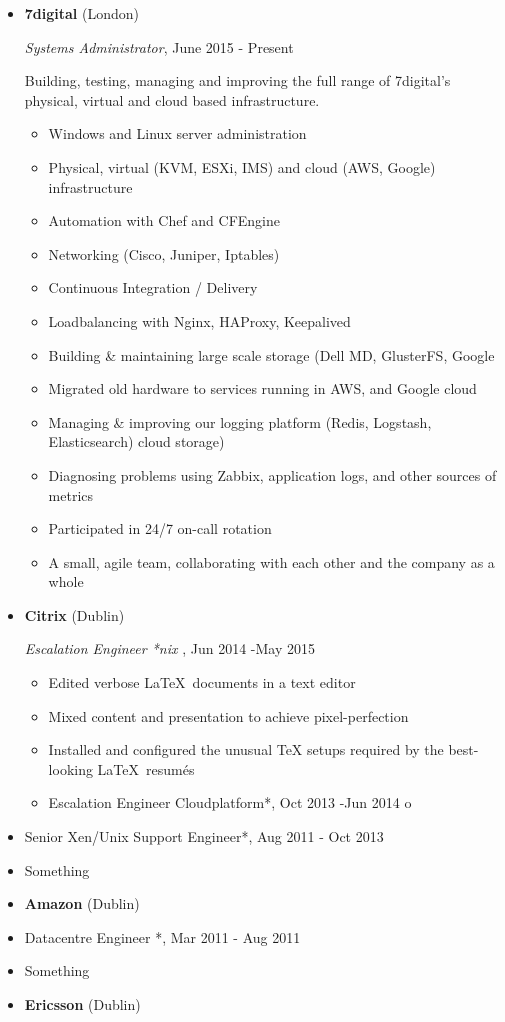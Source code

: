 \documentclass[]{article}
\providecommand{\tightlist}{%
  \setlength{\itemsep}{0pt}\setlength{\parskip}{0pt}}
\begin{document}
\begin{itemize}
\item
  \textbf{7digital} (London)

  \emph{Systems Administrator}, June 2015 - Present

  Building, testing, managing and improving the full range of 7digital's
  physical, virtual and cloud based infrastructure.

  \begin{itemize}
  \tightlist
  \item
    Windows and Linux server administration
  \item
    Physical, virtual (KVM, ESXi, IMS) and cloud (AWS, Google)
    infrastructure
  \item
    Automation with Chef and CFEngine
  \item
    Networking (Cisco, Juniper, Iptables)
  \item
    Continuous Integration / Delivery
  \item
    Loadbalancing with Nginx, HAProxy, Keepalived
  \item
    Building \& maintaining large scale storage (Dell MD, GlusterFS,
    Google
  \item
    Migrated old hardware to services running in AWS, and Google cloud
  \item
    Managing \& improving our logging platform (Redis, Logstash,
    Elasticsearch) cloud storage)
  \item
    Diagnosing problems using Zabbix, application logs, and other
    sources of metrics
  \item
    Participated in 24/7 on-call rotation
  \item
    A small, agile team, collaborating with each other and the company
    as a whole
  \end{itemize}
\item
  \textbf{Citrix} (Dublin)

  \emph{Escalation Engineer *nix }, Jun 2014 -May 2015

  \begin{itemize}
  \item
    Edited verbose \LaTeX~documents in a text editor
  \item
    Mixed content and presentation to achieve pixel-perfection
  \item
    Installed and configured the unusual TeX setups required by the
    best-looking \LaTeX~resumés
  \item
    Escalation Engineer Cloudplatform*, Oct 2013 -Jun 2014 o
  \end{itemize}
\item
  Senior Xen/Unix Support Engineer*, Aug 2011 - Oct 2013
\item
  Something
\item
  \textbf{Amazon} (Dublin)
\item
  Datacentre Engineer *, Mar 2011 - Aug 2011
\item
  Something
\item
  \textbf{Ericsson} (Dublin)
\end{itemize}
\end{document}
